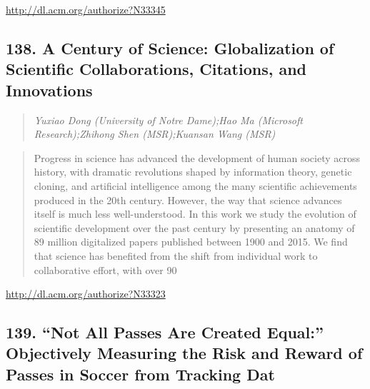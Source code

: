 \documentclass{article}
\begin{document}
\href{http://dl.acm.org/authorize?N33345}{http://dl.acm.org/authorize?N33345}

\subsection{138. A Century of Science: Globalization of Scientific Collaborations, Citations, and Innovations}

\begin{quote}
\footnotesize{\textit{Yuxiao Dong (University of Notre Dame);Hao Ma (Microsoft Research);Zhihong Shen (MSR);Kuansan Wang (MSR)}}

\end{quote}

\begin{quote}
Progress in science has advanced the development of human society across history, with dramatic revolutions shaped by information theory, genetic cloning, and artificial intelligence among the many scientific achievements produced in the 20th century. However, the way that science advances itself is much less well-understood. In this work we study the evolution of scientific development over the past century by presenting an anatomy of 89 million digitalized papers published between 1900 and 2015. We find that science has benefited from the shift from individual work to collaborative effort, with over 90%
\end{quote}

\href{http://dl.acm.org/authorize?N33323}{http://dl.acm.org/authorize?N33323}

\subsection{139. “Not All Passes Are Created Equal:” Objectively Measuring the Risk and Reward of Passes in Soccer from Tracking Dat}
\end{document}
